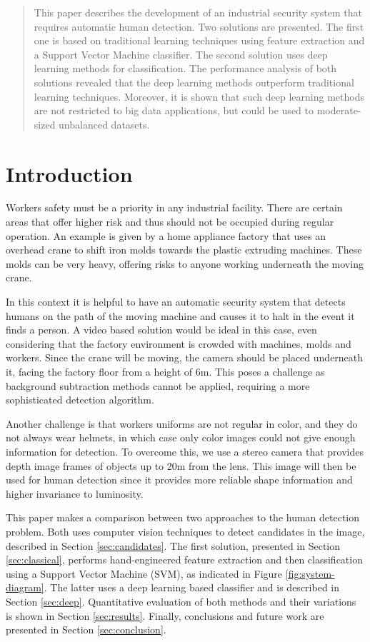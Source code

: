 \begin{abstract}
This paper describes the development of an industrial security system that requires automatic human detection. Two solutions are presented. The first one is based on traditional learning techniques using feature extraction and a Support Vector Machine classifier. The second solution uses deep learning methods for classification. The performance analysis of both solutions revealed that the deep learning methods outperform traditional learning techniques. Moreover, it is shown that such deep learning methods are not restricted to big data applications, but could be used to moderate-sized unbalanced datasets.
\end{abstract}

\section{Introduction}
  Workers safety must be a priority in any industrial facility. There are certain areas that offer higher risk and thus should not be occupied during regular operation. An example is given by a home appliance factory that uses an overhead crane to shift iron molds towards the plastic extruding machines. These molds can be very heavy, offering risks to anyone working underneath the moving crane.

  In this context it is helpful to have an automatic security system that detects humans on the path of the moving machine and causes it to halt in the event it finds a person. A video based solution would be ideal in this case, even considering that the factory environment is crowded with machines, molds and workers. Since the crane will be moving, the camera should be placed underneath it,  facing the factory floor from a height of 6m. This poses a challenge as background subtraction methods cannot be applied, requiring a more sophisticated detection algorithm.

  Another challenge is that workers uniforms are not regular in color, and they do not always wear helmets, in which case only color images could not give enough information for detection. To overcome this, we use a stereo camera that provides depth image frames of objects up to 20m from the lens. This image will then be used for human detection since it provides more reliable shape information and higher invariance to luminosity.

  This paper makes a comparison between two approaches to the human detection problem. Both uses computer vision techniques to detect candidates in the image, described in Section \ref{sec:candidates}. The first solution, presented in Section \ref{sec:classical}, performs hand-engineered feature extraction and then classification using a Support Vector Machine (SVM), as indicated in Figure \ref{fig:system-diagram}. The latter uses a deep learning based classifier and is described in Section \ref{sec:deep}. Quantitative evaluation of both methods and their variations is shown in Section \ref{sec:results}. Finally, conclusions and future work are presented in Section \ref{sec:conclusion}.

